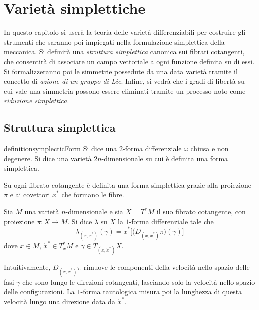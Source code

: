 \chapter{Varietà simplettiche}
In questo capitolo si userà la teoria delle varietà differenziabili per costruire gli strumenti che saranno poi impiegati nella formulazione simplettica della meccanica. Si definirà una \emph{struttura simplettica} canonica sui fibrati cotangenti, che consentirà di associare un campo vettoriale a ogni funzione definita su di essi. Si formalizzeranno poi le simmetrie possedute da una data varietà tramite il concetto di \emph{azione di un gruppo di Lie}. Infine, si vedrà che i gradi di libertà su cui vale una simmetria possono essere eliminati tramite un processo noto come \emph{riduzione simplettica}.

\section{Struttura simplettica}

\begin{restatable}{definition}{symplecticForm}
  Si dice  una $2$-forma differenziale $\omega$ chiusa e non degenere. Si dice  una varietà $2n$-dimensionale su cui è definita una forma simplettica.
\end{restatable}
Su ogni fibrato cotangente è definita una forma simplettica grazie alla proiezione $\pi$ e ai covettori $\dot{x}^*$ che formano le fibre.
\begin{definition}
  Sia $M$ una varietà $n$-dimensionale e sia $X = T^*M$ il suo fibrato cotangente, con proiezione $\pi:X\to M$. Si dice  $\lambda$ su $X$ la $1$-forma differenziale tale che \begin{equation*}
  \lambda_{(x, \dot{x}^*)}(\gamma) = \dot{x}^* \bigg[\big(D_{(x, \dot{x}^*)} \pi\big)(\gamma)\bigg]
  \end{equation*} 
  dove $x \in M$, $\dot{x}^* \in T_x^* M$ e $\gamma \in T_{(x,\dot{x}^*)}X$.
\end{definition}
\begin{remark}
  Intuitivamente, $D_{(x,\dot{x}^*)} \pi$ rimuove le componenti della velocità nello spazio delle fasi $\gamma$ che sono lungo le direzioni cotangenti, lasciando solo la velocità nello spazio delle configurazioni. La $1$-forma tautologica misura poi la lunghezza di questa velocità lungo una direzione data da $\dot{x}^*$. 
\end{remark}

